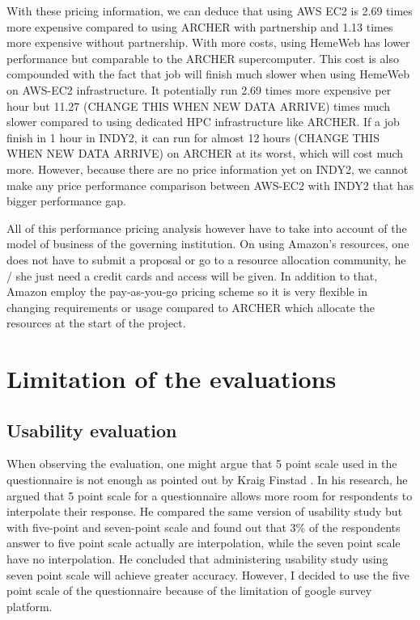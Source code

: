 With these pricing information, we can deduce that using AWS EC2 is 2.69 times more expensive compared to using ARCHER with partnership and 1.13 times more expensive without partnership. With more costs, using HemeWeb has lower performance but comparable to the ARCHER supercomputer. This cost is also compounded with the fact that job will finish much slower when using HemeWeb on AWS-EC2 infrastructure. It potentially run 2.69 times more expensive per hour but 11.27 (CHANGE THIS WHEN NEW DATA ARRIVE) times much slower compared to using dedicated HPC infrastructure like ARCHER. If a job finish in 1 hour in INDY2, it can run for almost 12 hours (CHANGE THIS WHEN NEW DATA ARRIVE) on ARCHER at its worst, which will cost much more. However, because there are no price information yet on INDY2, we cannot make any price performance comparison between AWS-EC2 with INDY2 that has bigger performance gap. 


All of this performance pricing analysis however have to take into account of the model of business of the governing institution. On using Amazon's resources, one does not have to submit a proposal or go to a resource allocation community, he / she just need a credit cards and access will be given. In addition to that, Amazon employ the pay-as-you-go pricing scheme so it is very flexible in changing requirements or usage compared to ARCHER which allocate the resources at the start of the project. 


\section {Limitation of the evaluations}

\subsection{Usability evaluation}

When observing the evaluation, one might argue that 5 point scale used in the questionnaire is not enough as pointed out by Kraig Finstad \cite{finstad2010response}. In his research, he argued that 5 point scale for a questionnaire allows more room for respondents to interpolate their response. He compared the same version of usability study but with five-point and seven-point scale and found out that 3\% of the respondents answer to five point scale actually are interpolation, while the seven point scale have no interpolation. He concluded that administering usability study using seven point scale will achieve greater accuracy. However, I decided to use the five point scale of the questionnaire because of the limitation of google survey platform. 

